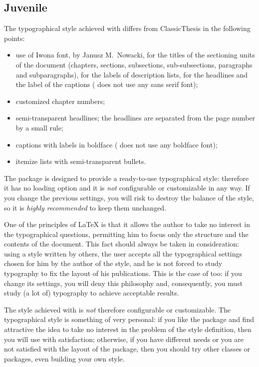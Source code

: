 \subsection{Juvenile}
The typographical style achieved with \arsclassica{} differs from ClassicThesis in the following points:
\begin{itemize}
\item use of Iwona font, by Janusz M.~Nowacki, for the titles of the sectioning units of the document (chapters, sections, subsections, sub-subsections, paragraphs and subparagraphs), for the labels of description lists, for the headlines and the label of the captions (\classicthesis{} does not use any sans serif font);
\item customized chapter numbers;
\item semi-transparent headlines; the headlines are separated from the page number by a small rule;
\item captions with labels in boldface (\classicthesis{} does not use any boldface font);
\item itemize lists with semi-transparent bullets.
\end{itemize}

The \arsclassica{} package is designed  to provide a ready-to-use typographical style: therefore it has no loading option and it is \emph{not} configurable or customizable in any way. If you change the previous settings, you will risk to destroy the balance of the style, so it is \emph{highly recommended} to keep them unchanged.

One of the principles of \LaTeX{} is that it allows the author to take no interest in the typographical questions, permitting him to focus only the structure and the contents of the document. This fact should always be taken in consideration: using a style written by others, the user accepts all the typographical settings chosen for him by the author of the style, and he is not forced to study typography to fix the layout of his publications. This is the case of \arsclassica{} too: if you change its settings, you will deny this philosophy and, consequently, you must study (a lot of) typography to achieve acceptable results. 

The style achieved with \arsclassica{} is \emph{not} therefore configurable or customizable. The typographical style is something of very personal: if you like the package and find attractive the idea to take no interest in the problem of the style definition, then you will use \arsclassica{} with satisfaction; otherwise, if you have different needs or you are not satisfied with the layout of the package, then you should try other classes or packages, even building your own style.




